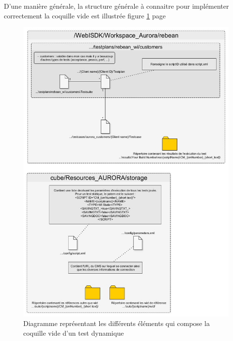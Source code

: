 D'une manière générale, la structure générale à connaitre pour implémenter correctement la coquille vide est illustrée figure \ref{figure:testEmptyShell} page \pageref{figure:testEmptyShell} 
\begin{figure}[!h]
  \centering
      \includegraphics[height=\textheight-1cm]{images/testEmptyShell.jpg}
  \caption{Diagramme représentant les différents éléments qui compose la coquille vide d'un test dynamique}
	\label{figure:testEmptyShell}
\end{figure}

